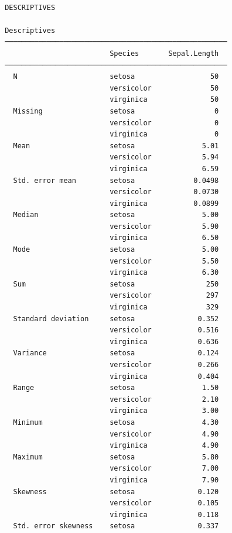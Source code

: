 \documentclass[]{article}
\begin{document}
\begin{verbatim}

 DESCRIPTIVES

 Descriptives                                          
 ───────────────────────────────────────────────────── 
                          Species       Sepal.Length   
 ───────────────────────────────────────────────────── 
   N                      setosa                  50   
                          versicolor              50   
                          virginica               50   
   Missing                setosa                   0   
                          versicolor               0   
                          virginica                0   
   Mean                   setosa                5.01   
                          versicolor            5.94   
                          virginica             6.59   
   Std. error mean        setosa              0.0498   
                          versicolor          0.0730   
                          virginica           0.0899   
   Median                 setosa                5.00   
                          versicolor            5.90   
                          virginica             6.50   
   Mode                   setosa                5.00   
                          versicolor            5.50   
                          virginica             6.30   
   Sum                    setosa                 250   
                          versicolor             297   
                          virginica              329   
   Standard deviation     setosa               0.352   
                          versicolor           0.516   
                          virginica            0.636   
   Variance               setosa               0.124   
                          versicolor           0.266   
                          virginica            0.404   
   Range                  setosa                1.50   
                          versicolor            2.10   
                          virginica             3.00   
   Minimum                setosa                4.30   
                          versicolor            4.90   
                          virginica             4.90   
   Maximum                setosa                5.80   
                          versicolor            7.00   
                          virginica             7.90   
   Skewness               setosa               0.120   
                          versicolor           0.105   
                          virginica            0.118   
   Std. error skewness    setosa               0.337   

\end{verbatim}
\end{document}
